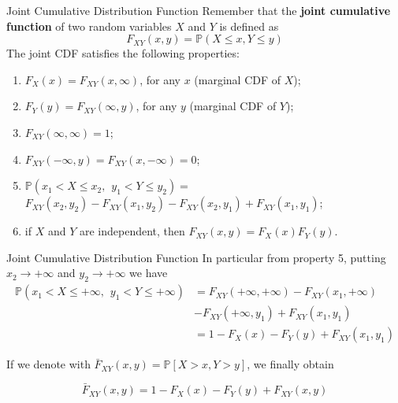 \documentclass[11pt]{beamer}
\theoremstyle{plain}
\theoremstyle{definition}
\theoremstyle{remark}
\begin{document}
\begin{frame}{Joint Cumulative Distribution Function}
	Remember that the \textbf{joint cumulative function} of two random variables $X$ and $Y$ 	is defined as
	\begin{equation}
			F_{XY}(x,y)= \mathbb{P}(X \leq x, Y \leq y)
	\end{equation}
	The joint CDF satisfies the following properties:
    \footnotesize{
    \begin{enumerate}
      	\item   				  						  
		$F_X(x)=F_{XY}(x, \infty)$, for any $x$ (marginal CDF of $X$); 
	  	\item 
	  	$F_Y(y)=F_{XY}(\infty,y)$, for any $y$ (marginal CDF of $Y$);
		\item 
		$F_{XY}(\infty, \infty)=1$;
		\item
		$F_{XY}(-\infty, y)=F_{XY}(x,-\infty)=0$;
		\item
		$\mathbb{P}(x_1 < X \leq x_2, \hspace{5pt} y_1  <Y \leq y_2)=$
        $F_{XY}(x_2,y_2)-F_{XY}(x_1,y_2)-F_{XY}(x_2,y_1)+F_{XY}(x_1,y_1)$;
        \item
        if $X$ and $Y$ are independent, then $F_{XY}(x,y)=F_X(x)F_Y(y)$.
   \end{enumerate}}
\end{frame}
%
\begin{frame}{Joint Cumulative Distribution Function}
		In particular from property 5, putting $x_2 \rightarrow +\infty$ and $y_2 
		\rightarrow +\infty$ we have
			\begin{equation}
			\begin{split}
			\mathbb{P}(x_1 < X \leq +\infty, \hspace{5pt} y_1  <Y \leq +\infty) & =
			     F_{XY}(+\infty,+\infty)-F_{XY}(x_1,+\infty) \\
			     & -F_{XY}(+\infty,y_1)+F_{XY}(x_1,y_1)      \\
			& = 1 - F_X(x) - F_Y(y) + F_{XY}(x_1,y_1)     
			\end{split}
			\end{equation}
        
		If we denote with $\bar F_{XY}(x, y ) = \mathbb{P}[X > x, Y > y]$, we finally obtain
		
		\begin{equation}
		\bar F_{XY}(x, y ) = 1 - F_X(x) - F_Y(y) + F_{XY}(x, y)
		\end{equation}
\end{frame}
\end{document}
